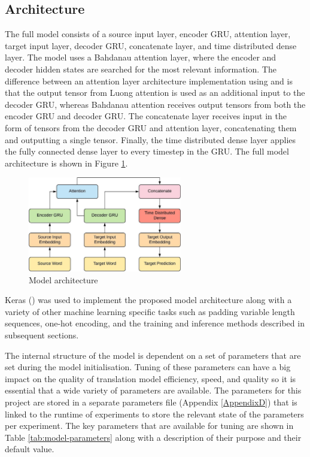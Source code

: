 \subsection{Architecture}
The full model consists of a source input layer, encoder \acrshort{GRU}, attention layer, target input layer, decoder \acrshort{GRU}, concatenate layer, and time distributed dense layer.
The model uses a Bahdanau attention layer, where the encoder and decoder hidden states are searched for the most relevant information. The difference between an attention layer architecture implementation using \cite{bahdanau_neural_2016} and \cite{luong_effective_2015} is that the output tensor from Luong attention is used as an additional input to the decoder \acrshort{GRU}, whereas Bahdanau attention receives output tensors from both the encoder \acrshort{GRU} and decoder \acrshort{GRU}.
The concatenate layer receives input in the form of tensors from the decoder \acrshort{GRU} and attention layer, concatenating them and outputting a single tensor. Finally, the time distributed dense layer applies the fully connected dense layer to every timestep in the \acrshort{GRU}. The full model architecture is shown in Figure \ref{fig:model_diagram}.



\begin{figure}[ht!]
\centering
\includegraphics[width=0.6\textwidth]{media/methodology/model_architecture.jpeg}
\captionsetup{justification=centering}
\caption[Diagram of the model architecture]{Model architecture}
\label{fig:model_diagram}
\end{figure}

Keras (\cite{keras_2015}) was used to implement the proposed model architecture along with a variety of other machine learning specific tasks such as padding variable length sequences, one-hot encoding, and the training and inference methods described in subsequent sections.


The internal structure of the model is dependent on a set of parameters that are set during the model initialisation. 
Tuning of these parameters can have a big impact on the quality of translation model efficiency, speed, and quality so it is essential that a wide variety of parameters are available. The parameters for this project are stored in a separate parameters file (Appendix \ref{AppendixD}) that is linked to the runtime of experiments to store the relevant state of the parameters per experiment. The key parameters that are available for tuning are shown in Table \ref{tab:model-parameters} along with a description of their purpose and their default value.

